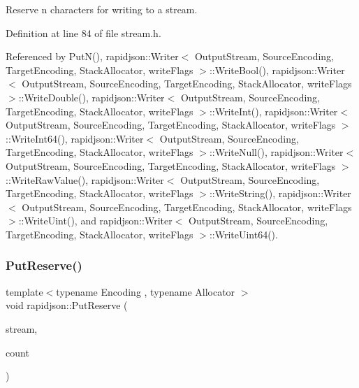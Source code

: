 Reserve n characters for writing to a stream. 



Definition at line 84 of file stream.\+h.


\begin{DoxyCode}{0}

\end{DoxyCode}


Referenced by Put\+N(), rapidjson\+::\+Writer$<$ Output\+Stream, Source\+Encoding, Target\+Encoding, Stack\+Allocator, write\+Flags $>$\+::\+Write\+Bool(), rapidjson\+::\+Writer$<$ Output\+Stream, Source\+Encoding, Target\+Encoding, Stack\+Allocator, write\+Flags $>$\+::\+Write\+Double(), rapidjson\+::\+Writer$<$ Output\+Stream, Source\+Encoding, Target\+Encoding, Stack\+Allocator, write\+Flags $>$\+::\+Write\+Int(), rapidjson\+::\+Writer$<$ Output\+Stream, Source\+Encoding, Target\+Encoding, Stack\+Allocator, write\+Flags $>$\+::\+Write\+Int64(), rapidjson\+::\+Writer$<$ Output\+Stream, Source\+Encoding, Target\+Encoding, Stack\+Allocator, write\+Flags $>$\+::\+Write\+Null(), rapidjson\+::\+Writer$<$ Output\+Stream, Source\+Encoding, Target\+Encoding, Stack\+Allocator, write\+Flags $>$\+::\+Write\+Raw\+Value(), rapidjson\+::\+Writer$<$ Output\+Stream, Source\+Encoding, Target\+Encoding, Stack\+Allocator, write\+Flags $>$\+::\+Write\+String(), rapidjson\+::\+Writer$<$ Output\+Stream, Source\+Encoding, Target\+Encoding, Stack\+Allocator, write\+Flags $>$\+::\+Write\+Uint(), and rapidjson\+::\+Writer$<$ Output\+Stream, Source\+Encoding, Target\+Encoding, Stack\+Allocator, write\+Flags $>$\+::\+Write\+Uint64().

\mbox{\label{namespacerapidjson_ab38d4a353d3577fdedd8171316af80b3}} 
\subsubsection{\texorpdfstring{PutReserve()}{PutReserve()}\hspace{0.1cm}{\footnotesize\ttfamily [2/2]}}
{\footnotesize\ttfamily template$<$typename Encoding , typename Allocator $>$ \\
void rapidjson\+::\+Put\+Reserve (\begin{DoxyParamCaption}\item[{\mbox{\hyperlink{classrapidjson_1_1_generic_string_buffer}{Generic\+String\+Buffer}}$<$ \mbox{\hyperlink{classrapidjson_1_1_encoding}{Encoding}}, \mbox{\hyperlink{classrapidjson_1_1_allocator}{Allocator}} $>$ \&}]{stream,  }\item[{size\+\_\+t}]{count }\end{DoxyParamCaption})}



